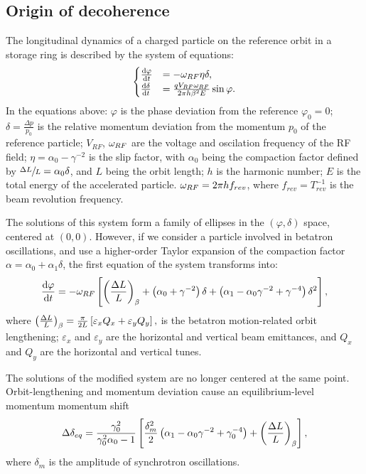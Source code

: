 \documentclass{article}
\begin{document}
\subsection{Origin of decoherence}
The longitudinal dynamics of a charged particle on the reference orbit in a storage ring is described by the system of equations:
\begin{equation*}
  \begin{cases}
    \frac{\mathrm{d} {\varphi}}{\mathrm{d} t} &= -\omega_{RF}\eta\delta, \\
    \frac{\mathrm{d} {\delta}}{\mathrm{d} t} &= \frac{q V_{RF}\omega_{RF}}{2\pi h\beta^2E}\sin\varphi.
  \end{cases}
\end{equation*}
In the equations above: $\varphi$ is the phase deviation from the reference $\varphi_0 = 0$; $\delta = \frac{\Delta p}{p_0}$ is the relative momentum deviation from the momentum $p_0$ of the reference particle; $V_{RF}$, $\omega_{RF}$ are the voltage and oscilation frequency of the RF field; $\eta = \alpha_0 - \gamma^{-2}$ is the slip factor, with $\alpha_0$ being the compaction factor defined by $\sfrac{\Delta L}{L} = \alpha_0\delta$, and $L$ being the orbit length; $h$ is the harmonic number; $E$ is the total energy of the accelerated particle. $\omega_{RF} = 2\pi h f_{rev}$, where $f_{rev}=T_{rev}^{-1}$ is the beam revolution frequency.

The solutions of this system form a family of ellipses in the $(\varphi, \delta)$ space, centered at $(0,0)$. However, if we consider a particle involved in betatron oscillations, and use a higher-order Taylor expansion of the compaction factor $\alpha = \alpha_0 + \alpha_1\delta$, the first equation of the system transforms into:~\citep[p.~2579]{Senichev:IPAC13}
\[
\ddt{\varphi} = -\w_{RF} \bkt*{\bkt{\frac{\Delta L}{L}}_\beta + \bkt{\alpha_0 + \gamma^{-2}}\delta + \bkt{\alpha_1 - \alpha_0\gamma^{-2} + \gamma^{-4}}\delta^2},
\]
where $\bkt{\frac{\Delta L}{L}}_\beta = \frac{\pi}{2L}\bkt*{\varepsilon_xQ_x + \varepsilon_yQ_y},$ is the betatron motion-related orbit lengthening; $\varepsilon_x$ and $\varepsilon_y$ are the horizontal and vertical beam emittances, and $Q_x$ and $Q_y$ are the horizontal and vertical tunes.~\citep[p.~2580]{Senichev:IPAC13}

The solutions of the modified system are no longer centered at the same point. Orbit-lengthening and momentum deviation cause an equilibrium-level momentum momentum shift~\citep[p.~2581]{Senichev:IPAC13}
\begin{equation*}
  \Delta\delta_{eq} = \frac{\gamma_0^2}{\gamma_0^2\alpha_0 - 1}\bkt*{\frac{\delta_m^2}{2}\bkt{\alpha_1 - \alpha_0\gamma^{-2} + \gamma_0^{-4}} + \bkt{\frac{\Delta L}{L}}_\beta},
\end{equation*}
where $\delta_m$ is the amplitude of synchrotron oscillations.
\end{document}
